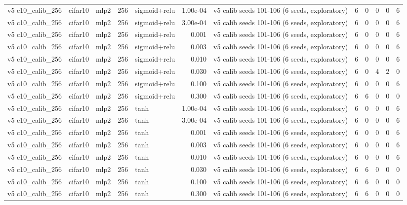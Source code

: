 \begin{table}[htbp]
{\begin{tabular}{@{}lllrlrlrrrrr@{}}
v5 c10\_calib\_256 & cifar10 & mlp2 & 256 & sigmoid+relu & 1.00e-04 & v5 calib seeds 101-106 (6 seeds, exploratory) & 6 & 0 & 0 & 0 & 6 \\
v5 c10\_calib\_256 & cifar10 & mlp2 & 256 & sigmoid+relu & 3.00e-04 & v5 calib seeds 101-106 (6 seeds, exploratory) & 6 & 0 & 0 & 0 & 6 \\
v5 c10\_calib\_256 & cifar10 & mlp2 & 256 & sigmoid+relu & 0.001 & v5 calib seeds 101-106 (6 seeds, exploratory) & 6 & 0 & 0 & 0 & 6 \\
v5 c10\_calib\_256 & cifar10 & mlp2 & 256 & sigmoid+relu & 0.003 & v5 calib seeds 101-106 (6 seeds, exploratory) & 6 & 0 & 0 & 0 & 6 \\
v5 c10\_calib\_256 & cifar10 & mlp2 & 256 & sigmoid+relu & 0.010 & v5 calib seeds 101-106 (6 seeds, exploratory) & 6 & 0 & 0 & 0 & 6 \\
v5 c10\_calib\_256 & cifar10 & mlp2 & 256 & sigmoid+relu & 0.030 & v5 calib seeds 101-106 (6 seeds, exploratory) & 6 & 0 & 4 & 2 & 0 \\
v5 c10\_calib\_256 & cifar10 & mlp2 & 256 & sigmoid+relu & 0.100 & v5 calib seeds 101-106 (6 seeds, exploratory) & 6 & 0 & 0 & 0 & 6 \\
v5 c10\_calib\_256 & cifar10 & mlp2 & 256 & sigmoid+relu & 0.300 & v5 calib seeds 101-106 (6 seeds, exploratory) & 6 & 6 & 0 & 0 & 0 \\
v5 c10\_calib\_256 & cifar10 & mlp2 & 256 & tanh & 1.00e-04 & v5 calib seeds 101-106 (6 seeds, exploratory) & 6 & 0 & 0 & 0 & 6 \\
v5 c10\_calib\_256 & cifar10 & mlp2 & 256 & tanh & 3.00e-04 & v5 calib seeds 101-106 (6 seeds, exploratory) & 6 & 0 & 0 & 0 & 6 \\
v5 c10\_calib\_256 & cifar10 & mlp2 & 256 & tanh & 0.001 & v5 calib seeds 101-106 (6 seeds, exploratory) & 6 & 0 & 0 & 0 & 6 \\
v5 c10\_calib\_256 & cifar10 & mlp2 & 256 & tanh & 0.003 & v5 calib seeds 101-106 (6 seeds, exploratory) & 6 & 0 & 0 & 0 & 6 \\
v5 c10\_calib\_256 & cifar10 & mlp2 & 256 & tanh & 0.010 & v5 calib seeds 101-106 (6 seeds, exploratory) & 6 & 0 & 0 & 0 & 6 \\
v5 c10\_calib\_256 & cifar10 & mlp2 & 256 & tanh & 0.030 & v5 calib seeds 101-106 (6 seeds, exploratory) & 6 & 6 & 0 & 0 & 0 \\
v5 c10\_calib\_256 & cifar10 & mlp2 & 256 & tanh & 0.100 & v5 calib seeds 101-106 (6 seeds, exploratory) & 6 & 6 & 0 & 0 & 0 \\
v5 c10\_calib\_256 & cifar10 & mlp2 & 256 & tanh & 0.300 & v5 calib seeds 101-106 (6 seeds, exploratory) & 6 & 6 & 0 & 0 & 0 \\

\end{tabular}}
\end{table}
